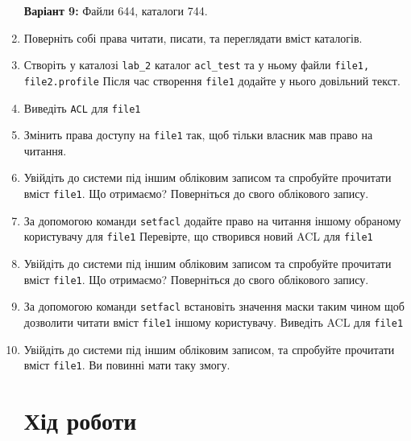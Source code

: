 \documentclass{article}
\begin{document}
\begin{enumerate}
	\textbf{Варіант 9:} Файли 644, каталоги 744.
	 
	 \item Поверніть собі права читати, писати, та переглядати вміст каталогів.
	 \item Створіть у каталозі \verb|lab_2| каталог \verb|acl_test| та у ньому файли
	 \verb|file1, file2.profile| Після час створення \verb|file1| додайте у нього
	 довільний текст.
	 \item Виведіть \verb|ACL| для \verb|file1|
	 \item Змінить права доступу на \verb|file1| так, щоб тільки власник мав право
	 на читання.
	 \item Увійдіть до системи під іншим обліковим записом та спробуйте
	 прочитати вміст \verb|file1|. Що отримаємо? Поверніться до свого
	 облікового запису.
	 \item За допомогою команди \verb|setfacl| додайте право на читання іншому
	 обраному користувачу для \verb|file1| Перевірте, що створився новий
	 ACL для \verb|file1|
	 \item Увійдіть до системи під іншим обліковим записом та спробуйте
	 прочитати вміст \verb|file1|. Що отримаємо? Поверніться до свого
	 облікового запису.
	 \item За допомогою команди \verb|setfacl| встановіть значення маски таким
	 чином щоб дозволити читати вміст \verb|file1| іншому користувачу.
	 Виведіть ACL для \verb|file1|
	 \item Увійдіть до системи під іншим обліковим записом, та спробуйте
	 прочитати вміст \verb|file1|. Ви повинні мати таку змогу.
	 
	\newpage
	
	\Large
\section*{Хід роботи}
	
\end{enumerate}
	
\end{document}
